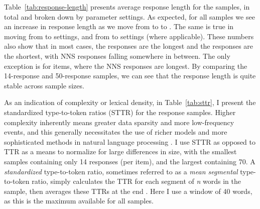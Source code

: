 Table~\ref{tab:response-length} presents average response length for the samples, in total and broken down by parameter settings. As expected, for all samples we see an increase in response length as we move from  to  to . The same is true in moving from  to  settings, and from  to  settings (where applicable). These numbers also show that in most cases, the  responses are the longest and the  responses are the shortest, with NNS responses falling somewhere in between. The only exception is for  items, where the NNS responses are longest. By comparing the 14-response and 50-response  samples, we can see that the response length is quite stable across sample sizes.

As an indication of complexity or lexical density, in Table~\ref{tab:sttr}, I present the standardized type-to-token ratios (STTR) for the response samples. Higher complexity inherently means greater data sparsity and more low-frequency events, and this generally necessitates the use of richer models and more sophisticated methods in natural language processing \cite{malvern2004lexical}. I use STTR as opposed to TTR as a means to normalize for large differences in size, with the smallest samples containing only 14 responses (per item), and the largest containing 70. A \textit{standardized} type-to-token ratio, sometimes referred to as a \textit{mean segmental} type-to-token ratio, simply calculates the TTR for each segment of \textit{n} words in the sample, then averages these TTRs at the end \cite{johnson1944studies, richards2000accommodation}. Here I use a window of 40 words, as this is the maximum available for all samples. 

